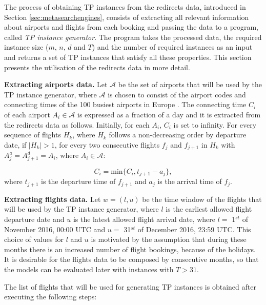 \documentclass{mpaper}
\begin{document}
The process of obtaining TP instances from the redirects data, introduced in Section \ref{sec:metasearchengines}, consists of extracting all relevant information about airports and flights from each booking and passing the data to a program, called \textit{TP instance generator}. The program takes the processed data, the required instance size ($m$, $n$, $d$ and $T$) and the number of required instances as an input and returns a set of TP instances that satisfy all these properties. This section presents the utilisation of the redirects data in more detail. 

\textbf{Extracting airports data.} Let $\mathcal{A}$ be the set of airports that will be used by the TP instance generator, where $\mathcal{A}$ is chosen to consist of the airport codes and connecting times of the 100 busiest airports in Europe \cite{busiestairports}. The connecting time $C_{i}$ of each airport $A_i \in \mathcal{A}$ is expressed as a fraction of a day and it is extracted from the redirects data as follows. Initially, for each $A_i$, $C_{i}$ is set to infinity. For every sequence of flights $H_k$, where $H_k$ follows a non-decreasing order by departure date, if $|H_k| > 1$, for every two consecutive flights $f_j$ and $f_{j+1}$ in $H_k$ with $A^a_j = A^d_{j+1} = A_i$, where $A_i \in \mathcal{A}$:

\vspace{-1mm}
$$ C_i = \textrm{min} \{C_i, t_{j+1} - a_j\}, $$
where $t_{j+1}$ is the departure time of $f_{j+1}$ and $a_j$ is the arrival time of $f_j$.

\textbf{Extracting flights data.} Let $w = (l, u)$ be the time window of the flights that will be used by the TP instance generator, where $l$ is the earliest allowed flight departure date and $u$ is the latest allowed flight arrival date, where $l =$ 1$^{st}$ of November 2016, 00:00 UTC and $u = $ 31$^{st}$ of December 2016, 23:59 UTC. This choice of values for $l$ and $u$ is motivated by the assumption that during these months there is an increased number of flight bookings, because of the holidays. It is desirable for the flights data to be composed by consecutive months, so that the models can be evaluated later with instances with $T > 31$.

The list of flights that will be used for generating TP instances is obtained after executing the following steps:
\end{document}
